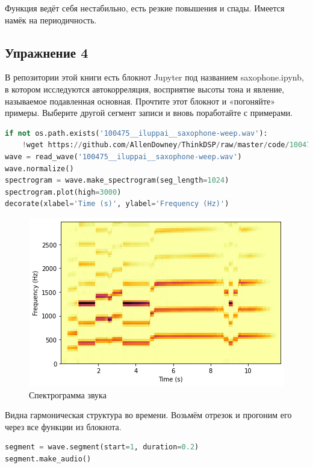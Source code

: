 Функция ведёт себя нестабильно, есть резкие повышения и спады. Имеется намёк на периодичность.

\subsection{Упражнение 4}

В репозитории этой книги есть блокнот Jupyter под названием saxophone.ipynb, в котором исследуются автокорреляция, восприятие высоты тона и явление, называемое подавленная основная. Прочтите этот блокнот и «погоняйте» примеры. Выберите другой сегмент записи и вновь поработайте с примерами.

\begin{lstlisting}[language=Python]
if not os.path.exists('100475__iluppai__saxophone-weep.wav'):
    !wget https://github.com/AllenDowney/ThinkDSP/raw/master/code/100475__iluppai__saxophone-weep.wav
wave = read_wave('100475__iluppai__saxophone-weep.wav')
wave.normalize()
spectrogram = wave.make_spectrogram(seg_length=1024)
spectrogram.plot(high=3000)
decorate(xlabel='Time (s)', ylabel='Frequency (Hz)')
\end{lstlisting}
\begin{figure}[H]
	\begin{center}
		\includegraphics[scale=1]{fig/lab05/lab05_33_0.png}
		\caption{Спектрограмма звука}
	\end{center}
\end{figure}

Видна гармоническая структура во времени. Возьмём отрезок и прогоним его через все функции из блокнота.

\begin{lstlisting}[language=Python]
segment = wave.segment(start=1, duration=0.2)
segment.make_audio()
\end{lstlisting}

